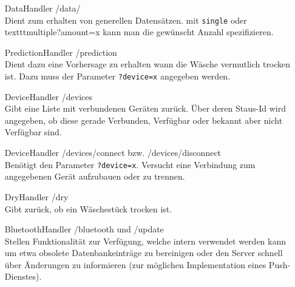 \begin{enumerate}
	\item[DataHandler] /data/ \\
	Dient zum erhalten von generellen Datensätzen. mit \texttt{single} oder texttt{multiple?amount=x} kann man die gewünscht Anzahl spezifizieren.
	\item[PredictionHandler] /prediction \\
	Dient dazu eine Vorhersage zu erhalten wann die Wäsche vermutlich trocken ist. Dazu muss der Parameter \texttt{?device=x} angegeben werden.
	\item[DeviceHandler] /devices \\
	Gibt eine Liste mit verbundenen Geräten zurück. Über deren Staus-Id wird angegeben, ob diese gerade Verbunden, Verfügbar oder bekannt aber nicht Verfügbar sind.
	\item[DeviceHandler] /devices/connect bzw. /devices/disconnect \\
	Benötigt den Parameter \texttt{?device=x}. Versucht eine Verbindung zum angegebenen Gerät aufzubauen oder zu trennen.
	\item[DryHandler] /dry \\
	Gibt zurück, ob ein Wäschestück trocken ist.
	\item[BluetoothHandler] /bluetooth und /update \\
	Stellen Funktionalität zur Verfügung, welche intern verwendet werden kann um etwa obsolete Datenbankeinträge zu bereinigen oder den Server schnell über Änderungen zu informieren (zur möglichen Implementation eines Push-Dienstes).
\end{enumerate}


